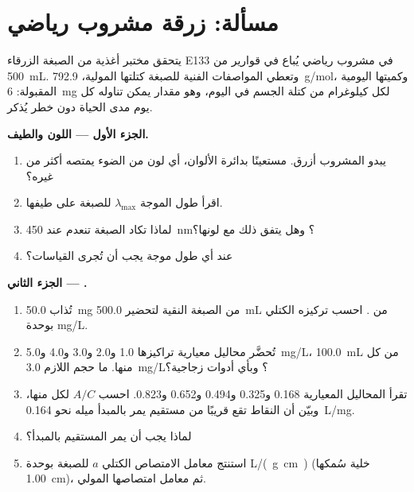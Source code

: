 \section{مسألة: زرقة مشروب رياضي}


\begin{problem}
\label{pb:g11:absorbance:1}
يتحقق مختبر أغذية من الصبغة الزرقاء E133 في مشروب رياضي يُباع في قوارير
من \qty{500}{mL}. وتعطي المواصفات الفنية للصبغة كتلتها المولية،
\qty{792.9}{g/mol}، وكميتها اليومية المقبولة: \qty{6}{mg} لكل
كيلوغرام من كتلة الجسم في اليوم، وهو مقدار يمكن تناوله كل يوم مدى الحياة
دون خطر يُذكر.

\medskip
\noindent\textbf{الجزء الأول --- اللون والطيف.}
\begin{enumerate}
  \item يبدو المشروب أزرق. مستعينًا بدائرة الألوان، أي لون من الضوء يمتصه
        أكثر من غيره؟
  \item اقرأ طول الموجة $\lambda_{\max}$ للصبغة على طيفها.
  \item لماذا تكاد  الصبغة تنعدم عند \qty{450}{nm}؟
        وهل يتفق ذلك مع لونها؟
  \item عند أي طول موجة يجب أن تُجرى القياسات؟
\end{enumerate}

\medskip
\noindent\textbf{الجزء الثاني --- .}
\begin{enumerate}[resume]
  \item تُذاب \qty{50.0}{mg} من الصبغة النقية لتحضير \qty{500.0}{mL}
        من . احسب تركيزه الكتلي بوحدة \si{mg/L}.
  \item تُحضَّر محاليل معيارية تراكيزها 1.0 و2.0 و3.0 و4.0 و\qty{5.0}{mg/L}،
        \qty{100.0}{mL} من كل منها. ما حجم  اللازم  \qty{3.0}{mg/L}؟ وبأي أدوات زجاجية؟
  \item تقرأ المحاليل المعيارية 0.168 و0.325 و0.494 و0.652 و0.823. احسب
        $A / C$ لكل منها، وبيّن أن النقاط تقع قريبًا من مستقيم يمر
        بالمبدأ ميله نحو \qty{0.164}{L/mg}.
  \item لماذا يجب أن يمر المستقيم بالمبدأ؟
  \item استنتج معامل الامتصاص الكتلي $a$ للصبغة بوحدة \si{L/(g.cm)} (خلية
        سُمكها \qty{1.00}{cm})، ثم معامل امتصاصها المولي.
\end{enumerate}


\end{problem}
